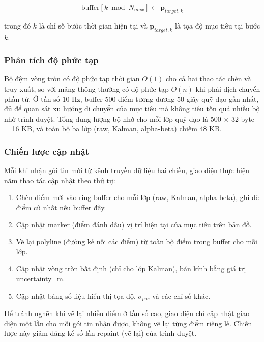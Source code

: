 \begin{equation}
\text{buffer}[k \bmod N_{max}] \leftarrow \mathbf{p}_{target,k}
\end{equation}

trong đó $k$ là chỉ số bước thời gian hiện tại và $\mathbf{p}_{target,k}$ là tọa độ mục tiêu tại bước $k$.

\subsubsection{Phân tích độ phức tạp}

\hspace{0.5cm} Bộ đệm vòng tròn có độ phức tạp thời gian $O(1)$ cho cả hai thao tác chèn và truy xuất, so với mảng thông thường có độ phức tạp $O(n)$ khi phải dịch chuyển phần tử. Ở tần số 10 Hz, buffer 500 điểm tương đương 50 giây quỹ đạo gần nhất, đủ để quan sát xu hướng di chuyển của mục tiêu mà không tiêu tốn quá nhiều bộ nhớ trình duyệt. Tổng dung lượng bộ nhớ cho mỗi lớp quỹ đạo là 500 $\times$ 32 byte = 16 KB, và toàn bộ ba lớp (raw, Kalman, alpha-beta) chiếm 48 KB.

\subsubsection{Chiến lược cập nhật}

\hspace{0.5cm} Mỗi khi nhận gói tin mới từ kênh truyền dữ liệu hai chiều, giao diện thực hiện năm thao tác cập nhật theo thứ tự:

\begin{enumerate}
    \item Chèn điểm mới vào ring buffer cho mỗi lớp (raw, Kalman, alpha-beta), ghi đè điểm cũ nhất nếu buffer đầy.
    \item Cập nhật marker (điểm đánh dấu) vị trí hiện tại của mục tiêu trên bản đồ.
    \item Vẽ lại polyline (đường kẻ nối các điểm) từ toàn bộ điểm trong buffer cho mỗi lớp.
    \item Cập nhật vòng tròn bất định (chỉ cho lớp Kalman), bán kính bằng giá trị uncertainty\_m.
    \item Cập nhật bảng số liệu hiển thị tọa độ, $\sigma_{pos}$ và các chỉ số khác.
\end{enumerate}

Để tránh nghẽn khi vẽ lại nhiều điểm ở tần số cao, giao diện chỉ cập nhật giao diện một lần cho mỗi gói tin nhận được, không vẽ lại từng điểm riêng lẻ. Chiến lược này giảm đáng kể số lần repaint (vẽ lại) của trình duyệt.

